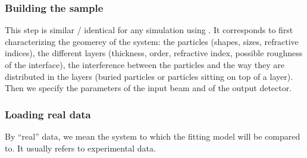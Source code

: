 
\subsubsection{Building the sample}
This step is similar / identical for any simulation using \BornAgain. It
corresponds to first characterizing  the geomerey of the system: the particles (shapes, sizes, refractive
indices), the different layers (thickness,
order, refractive index, possible roughness of the interface), the
interference between the particles and the way they are distributed in
the layers (buried particles or particles sitting on top of a
layer). Then we specify the parameters of the input beam and of the
output detector.

\subsubsection{Loading real data}
By ``real'' data, we mean the system to which the fitting model will
be compared to. It usually refers to experimental data.

